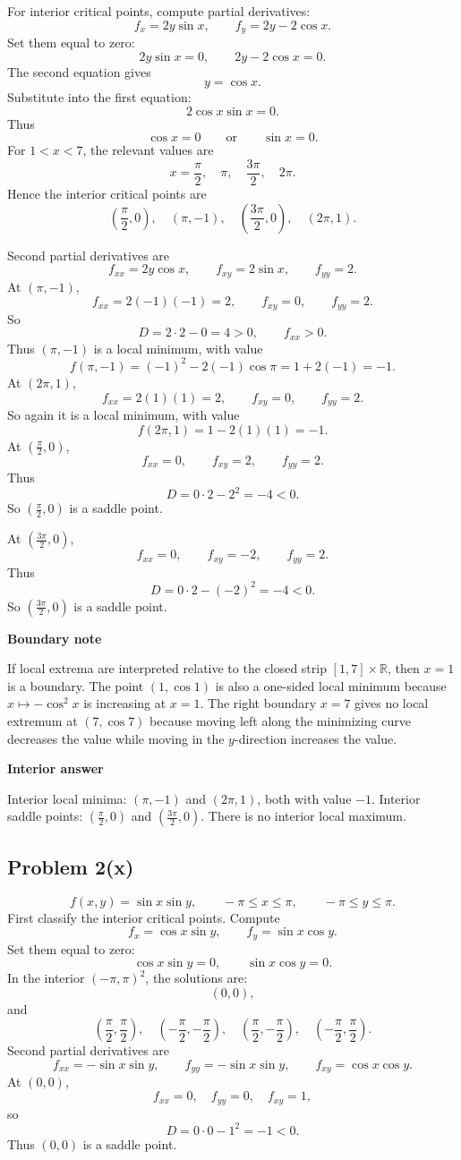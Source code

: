 \documentclass[11pt]{article}
\newenvironment{answerbox}[1]{\par\medskip\noindent\textcolor{linegreen}{\textbf{#1}}\par\smallskip}{\par\medskip}
\newenvironment{warningbox}[1]{\par\medskip\noindent\textcolor{orange!80!black}{\textbf{#1}}\par\smallskip}{\par\medskip}
\newcommand{\R}{\mathbb{R}}
\begin{document}
For interior critical points, compute partial derivatives:
\[
f_x=2y\sin x,
\qquad f_y=2y-2\cos x.
\]
Set them equal to zero:
\[
2y\sin x=0,
\qquad 2y-2\cos x=0.
\]
The second equation gives
\[
y=\cos x.
\]
Substitute into the first equation:
\[
2\cos x\sin x=0.
\]
Thus
\[
\cos x=0
\qquad\text{or}\qquad \sin x=0.
\]
For $1<x<7$, the relevant values are
\[
x=\frac\pi2,
\quad \pi,
\quad \frac{3\pi}{2},
\quad 2\pi.
\]
Hence the interior critical points are
\[
\left(\frac\pi2,0\right),
\quad (\pi,-1),
\quad \left(\frac{3\pi}{2},0\right),
\quad (2\pi,1).
\]

Second partial derivatives are
\[
f_{xx}=2y\cos x,
\qquad f_{xy}=2\sin x,
\qquad f_{yy}=2.
\]
At $(\pi,-1)$,
\[
f_{xx}=2(-1)(-1)=2,
\qquad f_{xy}=0,
\qquad f_{yy}=2.
\]
So
\[
D=2\cdot2-0=4>0,
\qquad f_{xx}>0.
\]
Thus $(\pi,-1)$ is a local minimum, with value
\[
f(\pi,-1)=(-1)^2-2(-1)\cos\pi=1+2(-1)=-1.
\]
At $(2\pi,1)$,
\[
f_{xx}=2(1)(1)=2,
\qquad f_{xy}=0,
\qquad f_{yy}=2.
\]
So again it is a local minimum, with value
\[
f(2\pi,1)=1-2(1)(1)=-1.
\]
At $\left(\frac\pi2,0\right)$,
\[
f_{xx}=0,
\qquad f_{xy}=2,
\qquad f_{yy}=2.
\]
Thus
\[
D=0\cdot2-2^2=-4<0.
\]
So $\left(\frac\pi2,0\right)$ is a saddle point.

At $\left(\frac{3\pi}{2},0\right)$,
\[
f_{xx}=0,
\qquad f_{xy}=-2,
\qquad f_{yy}=2.
\]
Thus
\[
D=0\cdot2-(-2)^2=-4<0.
\]
So $\left(\frac{3\pi}{2},0\right)$ is a saddle point.

\begin{warningbox}{Boundary note}
If local extrema are interpreted relative to the closed strip $[1,7]\times\R$, then $x=1$ is a boundary.  The point $(1,\cos1)$ is also a one-sided local minimum because $x\mapsto-\cos^2x$ is increasing at $x=1$.  The right boundary $x=7$ gives no local extremum at $(7,\cos7)$ because moving left along the minimizing curve decreases the value while moving in the $y$-direction increases the value.
\end{warningbox}

\begin{answerbox}{Interior answer}
Interior local minima: $(\pi,-1)$ and $(2\pi,1)$, both with value $-1$. Interior saddle points: $\left(\frac\pi2,0\right)$ and $\left(\frac{3\pi}{2},0\right)$. There is no interior local maximum.
\end{answerbox}

\subsection*{Problem 2(x)}
\[
f(x,y)=\sin x\sin y,
\qquad -\pi\le x\le\pi,
\qquad -\pi\le y\le\pi.
\]
First classify the interior critical points.  Compute
\[
f_x=\cos x\sin y,
\qquad f_y=\sin x\cos y.
\]
Set them equal to zero:
\[
\cos x\sin y=0,
\qquad \sin x\cos y=0.
\]
In the interior $(-\pi,\pi)^2$, the solutions are:
\[
(0,0),
\]
and
\[
\left(\frac\pi2,\frac\pi2\right),
\quad
\left(-\frac\pi2,-\frac\pi2\right),
\quad
\left(\frac\pi2,-\frac\pi2\right),
\quad
\left(-\frac\pi2,\frac\pi2\right).
\]
Second partial derivatives are
\[
f_{xx}=-\sin x\sin y,
\qquad f_{yy}=-\sin x\sin y,
\qquad f_{xy}=\cos x\cos y.
\]
At $(0,0)$,
\[
f_{xx}=0,
\quad f_{yy}=0,
\quad f_{xy}=1,
\]
so
\[
D=0\cdot0-1^2=-1<0.
\]
Thus $(0,0)$ is a saddle point.
\end{document}
